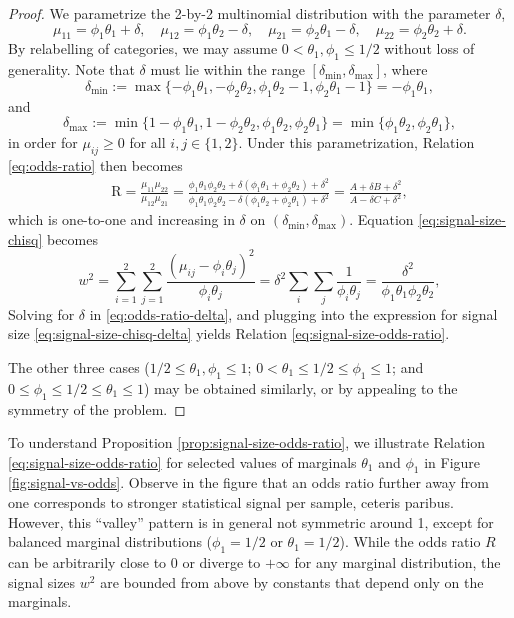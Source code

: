 \begin{proof}
	We parametrize the 2-by-2 multinomial distribution with the parameter $\delta$, 
	\begin{equation} \label{eq:reparametrize-2-by-2-table-1}
	\mu_{11} = \phi_1\theta_1+\delta,\quad 
	\mu_{12} = \phi_1\theta_2-\delta,\quad 
	\mu_{21} = \phi_2\theta_1-\delta,\quad 
	\mu_{22} = \phi_2\theta_2+\delta.
	\end{equation}
	By relabelling of categories, we may assume $0<\theta_1,\phi_1\le1/2$ without loss of generality.
	Note that $\delta$ must lie within the range $[\delta_\mathrm{min}, \delta_\mathrm{max}]$, where
	$$
	\delta_\mathrm{min} := \max\{-\phi_1\theta_1, -\phi_2\theta_2, \phi_1\theta_2-1, \phi_2\theta_1-1\} 
	= -\phi_1\theta_1,
	$$
	and
	$$
	\delta_\mathrm{max} := \min\{1-\phi_1\theta_1, 1-\phi_2\theta_2, \phi_1\theta_2, \phi_2\theta_1\}
	= \min\{\phi_1\theta_2, \phi_2\theta_1\},
	$$
	in order for $\mu_{ij}\ge0$ for all $i,j\in \{1,2\}$.
	Under this parametrization, Relation \eqref{eq:odds-ratio} then becomes
	\begin{align} \label{eq:odds-ratio-delta}
	\text{R} = \frac{\mu_{11}\mu_{22}}{\mu_{12}\mu_{21}}
	= \frac{\phi_1\theta_1\phi_2\theta_2 + \delta(\phi_1\theta_1+\phi_2\theta_2)+\delta^2}{\phi_1\theta_1\phi_2\theta_2 - \delta(\phi_1\theta_2+\phi_2\theta_1)+\delta^2}
	= \frac{A +\delta B + \delta^2}{A -\delta C + \delta^2},
	\end{align}
	which is one-to-one and increasing in $\delta$ on $(\delta_\mathrm{min}, \delta_\mathrm{max})$.
	Equation \eqref{eq:signal-size-chisq} becomes
	\begin{equation} \label{eq:signal-size-chisq-delta}
	w^2 = \sum_{i=1}^2 \sum_{j=1}^2 \frac{(\mu_{ij} - \phi_i\theta_j)^2}{\phi_i\theta_j}
	= \delta^2\sum_i\sum_j \frac{1}{\phi_i\theta_j}
	= \frac{\delta^2}{\phi_1\theta_1\phi_2\theta_2},
	\end{equation}
	Solving for $\delta$ in \eqref{eq:odds-ratio-delta}, and plugging into the expression for signal size \eqref{eq:signal-size-chisq-delta} yields Relation \eqref{eq:signal-size-odds-ratio}.
	
	The other three cases ($1/2\le\theta_1,\phi_1\le1$; $0<\theta_1\le1/2\le\phi_1\le1$; and $0\le\phi_1\le1/2\le\theta_1\le1$) may be obtained similarly, or by appealing to the symmetry of the problem.
\end{proof}

To understand Proposition \ref{prop:signal-size-odds-ratio}, we illustrate Relation \eqref{eq:signal-size-odds-ratio} for selected values of marginals $\theta_1$ and $\phi_1$ in Figure \ref{fig:signal-vs-odds}.
Observe in the figure that an odds ratio further away from one corresponds to stronger statistical signal per sample, ceteris paribus.
However, this ``valley'' pattern is in general not symmetric around 1, except for balanced marginal distributions ($\phi_1=1/2$ or $\theta_1=1/2$).
While the odds ratio $R$ can be arbitrarily close to 0 or diverge to $+\infty$ for any marginal distribution, the signal sizes $w^2$ are bounded from above by constants that depend only on the marginals.

